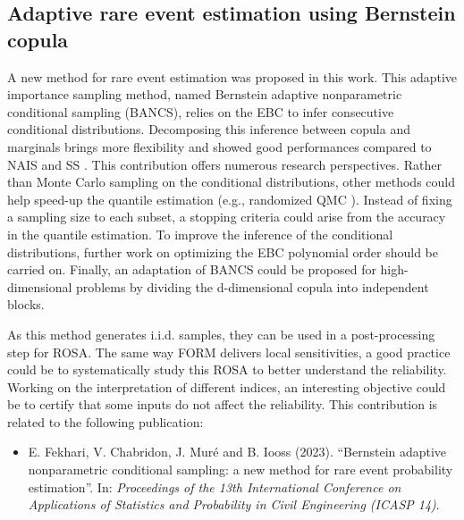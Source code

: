\subsection*{Adaptive rare event estimation using Bernstein copula}

A new method for rare event estimation was proposed in this work. 
This adaptive importance sampling method, named Bernstein adaptive nonparametric conditional sampling (BANCS), relies on the EBC to infer consecutive conditional distributions. 
Decomposing this inference between copula and marginals brings more flexibility and showed good performances compared to NAIS \citep{zhang_1996_NIS} and SS \citep{AuBeck2001}. 
This contribution offers numerous research perspectives. 
Rather than Monte Carlo sampling on the conditional distributions, other methods could help speed-up the quantile estimation (e.g., randomized QMC \citep{tuffin_2019}). 
Instead of fixing a sampling size to each subset, a stopping criteria could arise from the accuracy in the quantile estimation. 
To improve the inference of the conditional distributions, further work on optimizing the EBC polynomial order should be carried on. 
Finally, an adaptation of BANCS could be proposed for high-dimensional problems by dividing the d-dimensional copula into independent blocks.   

As this method generates i.i.d. samples, they can be used in a post-processing step for ROSA.
The same way FORM delivers local sensitivities, a good practice could be to systematically study this ROSA to better understand the reliability. 
Working on the interpretation of different indices, an interesting objective could be to certify that some inputs do not affect the reliability. 
This contribution is related to the following publication:
\begin{itemize}
    \footnotesize
    \item[\ding{125}] E. Fekhari, V. Chabridon, J. Muré and B. Iooss (2023). ``Bernstein adaptive nonparametric conditional sampling: a new method for rare event probability estimation''. In: \textit{Proceedings of the 13th International Conference on Applications of Statistics and Probability in Civil Engineering (ICASP 14)}.
\end{itemize}




